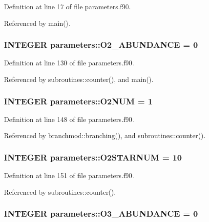 Definition at line 17 of file parameters.f90.

Referenced by main().\hypertarget{namespaceparameters_aa660e855c3fab9dbfe8096b783003413}{
\subsubsection[{O2\_\-ABUNDANCE}]{\setlength{\rightskip}{0pt plus 5cm}INTEGER {\bf parameters::O2\_\-ABUNDANCE} = 0}}
\label{namespaceparameters_aa660e855c3fab9dbfe8096b783003413}


Definition at line 130 of file parameters.f90.

Referenced by subroutines::counter(), and main().\hypertarget{namespaceparameters_aaa919dd1f480e5e72fff4b51292e7c94}{
\subsubsection[{O2NUM}]{\setlength{\rightskip}{0pt plus 5cm}INTEGER {\bf parameters::O2NUM} = 1}}
\label{namespaceparameters_aaa919dd1f480e5e72fff4b51292e7c94}


Definition at line 148 of file parameters.f90.

Referenced by branchmod::branching(), and subroutines::counter().\hypertarget{namespaceparameters_afd3b212b264c188754486b14476cd875}{
\subsubsection[{O2STARNUM}]{\setlength{\rightskip}{0pt plus 5cm}INTEGER {\bf parameters::O2STARNUM} = 10}}
\label{namespaceparameters_afd3b212b264c188754486b14476cd875}


Definition at line 151 of file parameters.f90.

Referenced by subroutines::counter().\hypertarget{namespaceparameters_a9d6097883f1419481b04c256065f6d24}{
\subsubsection[{O3\_\-ABUNDANCE}]{\setlength{\rightskip}{0pt plus 5cm}INTEGER {\bf parameters::O3\_\-ABUNDANCE} = 0}}
\label{namespaceparameters_a9d6097883f1419481b04c256065f6d24}


